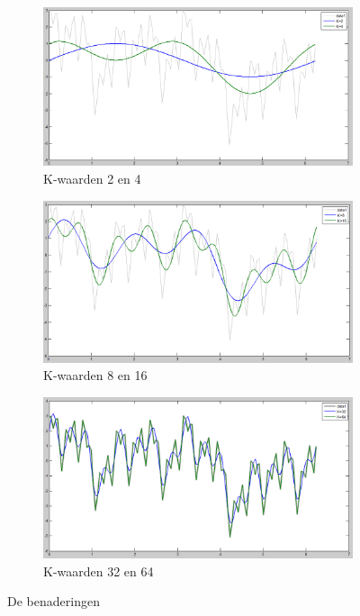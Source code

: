 \documentclass[a4paper, 12pt, titlepage]{report}
\begin{document}
\begin{figure}
\centering
\begin{subfigure}{.5\textwidth}
  \centering
  \includegraphics[width=.4\linewidth]{K2K4.png}
  \caption{K-waarden 2 en 4}
  \label{fig:sub1}
\end{subfigure}%
\begin{subfigure}{.5\textwidth}
  \centering
  \includegraphics[width=.4\linewidth]{K8K16.png}
  \caption{K-waarden 8 en 16}
  \label{fig:sub2}
\end{subfigure}
\begin{subfigure}{.5\textwidth}
  \centering
  \includegraphics[width=.4\linewidth]{K32K64.png}
  \caption{K-waarden 32 en 64}
  \label{fig:sub2}
\end{subfigure}
\caption{De benaderingen}
\label{fig:test}
\end{figure}
\end{document}
